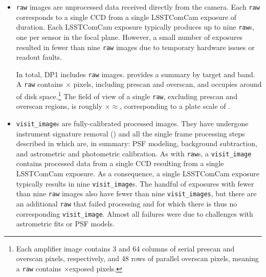\begin{itemize}
\item \texttt{raw} images are unprocessed data received directly from the \gls{camera}.
Each \texttt{raw} corresponds to a single \gls{CCD} from a single \gls{LSSTComCam} exposure of \exposuretime duration.
Each \gls{LSSTComCam} exposure typically produces up to nine \texttt{raw}s, one per sensor in the focal plane.
However, a small number of exposures resulted in fewer than nine \texttt{raw} images due to temporary hardware issues or readout faults.

In total, \gls{DP1} includes \nraws \texttt{raw} images.
 provides a summary by target and band.
A \texttt{raw} contains \nrawpixx $\times$ \nrawpixy pixels, including prescan and overscan, and occupies around \rawhdd of disk space.\footnote{Each amplifier image contains 3 and 64 columns of serial prescan and overscan pixels, respectively, and 48 rows of parallel overscan pixels, meaning a \texttt{raw} contains \nvisitimagepixx$\times$\nvisitimagepixy exposed pixels.}
The field of view of a single \texttt{raw}, excluding prescan and overscan regions, is roughly \visitimagefovx$\times$\visitimagefovy$\approx$\visitimagefov, corresponding to a plate scale of \rawplatescale.






\item \texttt{visit\_image}s are fully-calibrated processed images.
They have undergone instrument signature removal () and all the single frame processing steps described in  which are, in summary: \gls{PSF} modeling, \gls{background} subtraction, and astrometric and photometric \gls{calibration}.
As with \texttt{raw}s, a \texttt{visit\_image} contains processed data from a single \gls{CCD} resulting from a single \exposuretime \gls{LSSTComCam} exposure.
As a consequence, a single \gls{LSSTComCam} exposure typically results in nine \texttt{visit\_image}s.
The handful of exposures with fewer than nine \texttt{raw} images also have fewer than nine \texttt{visit\_images}, but there are an additional \nsfpfails \texttt{raw} that failed processing and for which there is thus no corresponding \texttt{visit\_image}. Almost all failures were due to challenges with astrometric fits or \gls{PSF} models.


\end{itemize}
